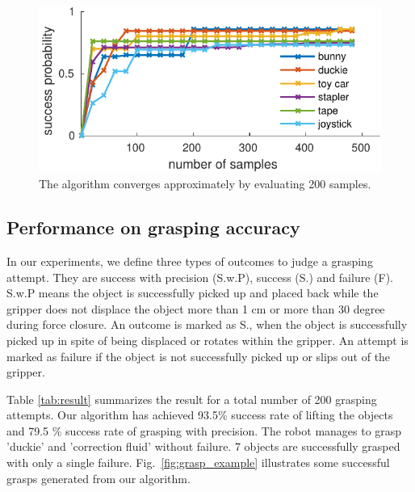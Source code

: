 \begin{figure}[!htpb]
\centering
\includegraphics[width=0.7\linewidth]{figure/algo_prob2-crop.pdf}
\caption{The algorithm converges approximately by evaluating 200 samples.}
\label{fig:algo_prob}
\end{figure}


\subsection{Performance on grasping accuracy}
In our experiments, we define three types of outcomes to judge a grasping attempt. They are success with precision (S.w.P),  success (S.) and failure (F). S.w.P means the object is successfully picked up and placed back while the gripper does not displace the object more than 1 cm or more than 30 degree during force closure. An outcome is marked as S., when the object is successfully picked up in spite of being displaced or rotates within the gripper. An attempt is marked as failure if the object is not successfully picked up or slips out of the gripper. 

Table \ref{tab:result} summarizes the result for a total number of 200 grasping attempts. Our algorithm has achieved 93.5\% success rate of lifting the objects and 79.5 \%  success rate of grasping with precision. The robot manages to grasp 'duckie' and 'correction fluid' without failure. 7 objects are successfully grasped with only a single failure. Fig.~\ref{fig:grasp_example} illustrates some successful grasps generated from our algorithm. 

